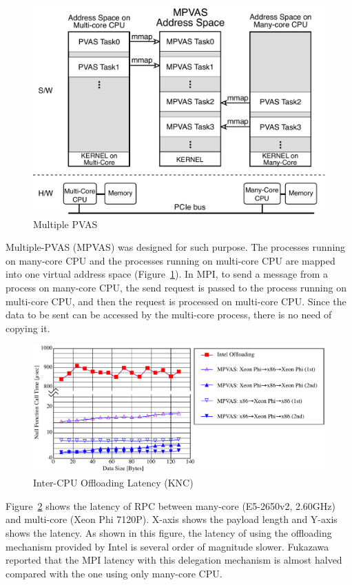 \begin{figure}[ht]
\begin{center}
\includegraphics[width=0.8\columnwidth]{Figs/MPVAS.pdf}
  \caption{Multiple PVAS}
  \label{fig:mpvas}
\end{center}
\end{figure}

Multiple-PVAS (MPVAS) was designed for such purpose. The processes
running on many-core CPU and the processes running on multi-core CPU
are mapped into one virtual address space
(Figure~\ref{fig:mpvas})\cite{fukazawa-thesis}. In MPI, to 
send a message from a process on many-core CPU, the send request is
passed to the process running on multi-core CPU, and then the request
is processed on multi-core CPU. Since the data to be sent can be
accessed by the multi-core process, there is no need of copying it. 

\begin{figure}[ht]
\begin{center}
\includegraphics[width=0.95\columnwidth]{Figs/MPVAS-TAT.pdf}
  \caption{Inter-CPU Offloading Latency (KNC)}
  \label{fig:mpvas-tat}
\end{center}
\end{figure}

Figure~\ref{fig:mpvas-tat} shows the latency of RPC between many-core
(E5-2650v2, 2.60GHz) and multi-core (Xeon Phi 7120P). X-axis shows the
payload length and Y-axis shows the latency. As shown in this figure,
the latency of using the offloading mechanism provided by Intel is
several order of magnitude slower. Fukazawa reported that the MPI
latency with this delegation mechanism is almost halved compared with
the one using only many-core CPU\cite{fukazawa-thesis}. 

